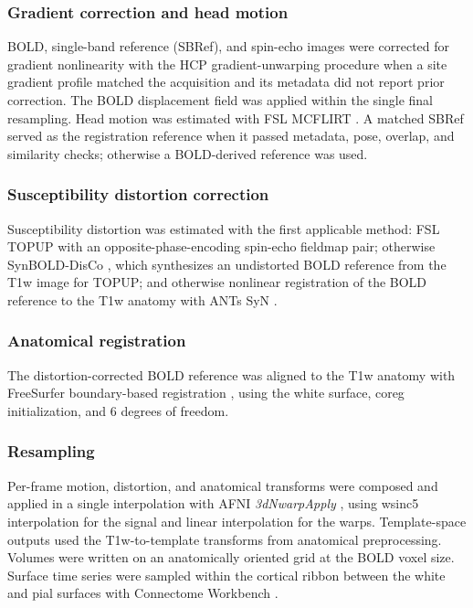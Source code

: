 \subsubsection*{Gradient correction and head motion}

BOLD, single-band reference (SBRef), and spin-echo images were corrected for gradient nonlinearity with the HCP gradient-unwarping procedure \citep{glasser2013minimal} when a site gradient profile matched the acquisition and its metadata did not report prior correction. The BOLD displacement field was applied within the single final resampling. Head motion was estimated with FSL MCFLIRT \citep{jenkinson2002mcflirt}. A matched SBRef served as the registration reference when it passed metadata, pose, overlap, and similarity checks; otherwise a BOLD-derived reference was used.

\subsubsection*{Susceptibility distortion correction}

Susceptibility distortion was estimated with the first applicable method: FSL TOPUP \citep{andersson2003topup} with an opposite-phase-encoding spin-echo fieldmap pair; otherwise SynBOLD-DisCo \citep{yu2023synbold}, which synthesizes an undistorted BOLD reference from the T1w image for TOPUP; and otherwise nonlinear registration of the BOLD reference to the T1w anatomy with ANTs SyN \citep{avants2008syn}.

\subsubsection*{Anatomical registration}

The distortion-corrected BOLD reference was aligned to the T1w anatomy with FreeSurfer boundary-based registration \citep{greve2009bbr}, using the white surface, coreg initialization, and 6 degrees of freedom.

\subsubsection*{Resampling}

Per-frame motion, distortion, and anatomical transforms were composed and applied in a single interpolation with AFNI \emph{3dNwarpApply} \citep{cox1996afni}, using wsinc5 interpolation for the signal and linear interpolation for the warps. Template-space outputs used the T1w-to-template transforms from anatomical preprocessing. Volumes were written on an anatomically oriented grid at the BOLD voxel size. Surface time series were sampled within the cortical ribbon between the white and pial surfaces with Connectome Workbench \citep{marcus2011workbench}.


